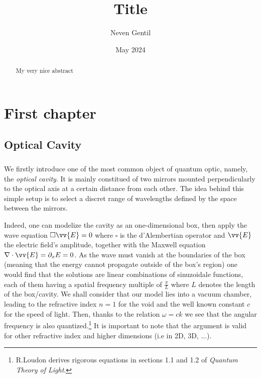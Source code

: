\documentclass[12pt]{report}
\begin{document}
\title{Title}
\author{Neven Gentil}
\date{May 2024}
\maketitle

\begin{abstract}
My very nice abstract
\end{abstract}

\chapter{First chapter}
\section{Optical Cavity}
\paragraph{}
We firstly introduce one of the most common object of quantum optic, namely, the \textit{optical cavity}. It is mainly constitued of two mirrors mounted perpendicularly to the optical axis at a certain distance from each other. The idea behind this simple setup is to select a discret range of wavelengths defined by the space between the mirrors. 

Indeed, one can modelize the cavity as an one-dimensional box, then apply the wave equation $ \square \vv{E} = 0$ where $\square$ is the d'Alembertian operator and $\vv{E}$ the electric field's amplitude, together with the Maxwell equation $\nabla \cdot \vv{E} = \partial _x E = 0$. As the wave must vanish at the boundaries of the box (meaning that the energy cannot propagate outside of the box's region) one would find that the solutions are linear combinations of sinuzoidale functions, each of them having a spatial frequency multiple of $\frac{\pi}{L}$ where $L$ denotes the length of the box/cavity. We shall consider that our model lies into a vacuum chamber, leading to the refractive index $n=1$ for the void and the well known constant $ c$ for the speed of light. Then, thanks to the relation $\omega = ck$ we see that the angular frequency is also quantized.\footnote{R.Loudon derives rigorous equations in sections 1.1 and 1.2 of \textit{Quantum Theory of Light}.} It is important to note that the argument is valid for other refractive index and higher dimensions (i.e in 2D, 3D, ...).
\end{document}

